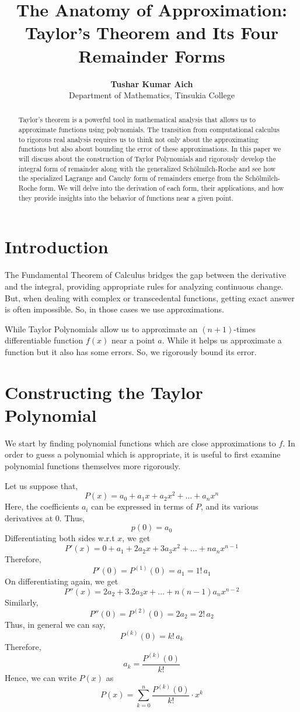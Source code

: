\documentclass[12pt, a4paper]{article}
\title{\textbf{\Large The Anatomy of Approximation: \\ \large Taylor's Theorem and Its Four Remainder Forms}}
\author{\textbf{Tushar Kumar Aich} \\
\small{Department of Mathematics, Tinsukia College}
}
\theoremstyle{definition}
\theoremstyle{remark}
\begin{document}
\maketitle

\begin{abstract}
Taylor's theorem is a powerful tool in mathematical analysis that allows us to approximate functions using polynomials. The transition from computational calculus to rigorous real analysis requires us to think not only about the approximating functions but also about bounding the error of these approximations. In this paper we will discuss about the construction of Taylor Polynomials and rigorously develop the integral form of remainder along with the generalized Sch\"{o}lmilch-Roche and see how the specialized Lagrange and Cauchy form of remainders emerge from the Sch\"{o}lmilch-Roche form. We will delve into the derivation of each form, their applications, and how they provide insights into the behavior of functions near a given point.
\end{abstract}

\section{Introduction}
The Fundamental Theorem of Calculus bridges the gap between the derivative and the integral, providing appropriate rules for analyzing continuous change. But, when dealing with complex or transcedental functions, getting exact answer is often impossible. So, in those cases we use approximations.

While Taylor Polynomials allow us to approximate an $(n+1)$-times differentiable function $f(x)$ near a point $a$. While it helps us approximate a function but it also has some errors. So, we rigorously bound its error.

\section{Constructing the Taylor Polynomial}
We start by finding polynomial functions which are close approximations to $f$. In order to guess a polynomial which is appropriate, it is useful to first examine polynomial functions themselves more rigorously.

Let us suppose that,
\[
P(x) = a_0 + a_1x + a_2x^2 + \ldots + a_nx^n
\]
Here, the coefficients $a_i$ can be expressed in terms of $P$, and its various derivatives at $0$. Thus, 
\[p(0) = a_0\]
Differentiating both sides w.r.t $x$, we get
\[
P'(x) = 0 + a_1 + 2a_2x + 3a_3x^2 + \ldots + na_nx^{n-1}
\]
Therefore,\[P'(0) = P^{(1)}(0) = a_1 = 1! \,a_1\]
On differentiating again, we get
\[
P''(x) = 2a_2 + 3.2a_3x + \ldots + n(n-1)a_nx^{n-2}
\]
Similarly,\[P''(0) = P^{(2)}(0) = 2a_2 = 2! \, a_2\]
Thus, in general we can say, \[P^{(k)}(0) = k! \, a_k\]
Therefore, \[a_k = \frac{P^{(k)}(0)}{k!}\]
Hence, we can write $P(x)$ as \[P(x) = \sum_{k = 0}^{n} \frac{P^{(k)}(0)}{k!} \cdot x^k\]
\end{document}
